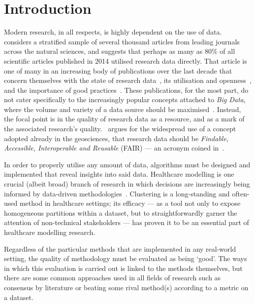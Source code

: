 \section{Introduction}\label{sec:intro}

Modern research, in all respects, is highly dependent on the use of
data.~\cite{Womack2015} considers a stratified sample of several thousand
articles from leading journals across the natural sciences, and suggests that
perhaps as many as 80\% of all scientific articles published in 2014 utilised
research data directly. That article is one of many in an increasing body of
publications over the last decade that concern themselves with the state of
research data~\cite{Higman2019}, its utilisation and
openness~\cite{Aslam2017,Zuiderwijk2020}, and the importance of good
practices~\cite{Colavizza2020,Corti2019}. These publications, for the most part,
do not cater specifically to the increasingly popular concepts attached to
\emph{Big Data}, where the volume and variety of a data source should be
maximised~\cite{Batisti2019}. Instead, the focal point is in the quality of
research data as a resource, and as a mark of the associated research's
quality.~\cite{Stall2019} argues for the widespread use of a concept adopted
already in the geosciences, that research data should be \emph{Findable,
Accessible, Interoperable and Reusable} (FAIR) --- an acronym coined
in~\cite{Wilkinson2016}.

In order to properly utilise any amount of data, algorithms must be designed and
implemented that reveal insights into said data. Healthcare modelling is one
crucial (albeit broad) branch of research in which decisions are increasingly
being informed by data-driven
methodologies~\cite{Alexander2018,Belle2015,RiosZertuche2020}. Clustering is a
long-standing and often-used method in healthcare settings; its efficacy --- as
a tool not only to expose homogeneous partitions within a dataset, but to
straightforwardly garner the attention of non-technical stakeholders --- has
proven it to be an essential part of healthcare modelling research.

Regardless of the particular methods that are implemented in any real-world
setting, the quality of methodology must be evaluated as being `good'. The ways
in which this evaluation is carried out is linked to the methods themselves, but
there are some common approaches used in all fields of research such as
consensus by literature or beating some rival method(s) according to a metric on
a dataset.

